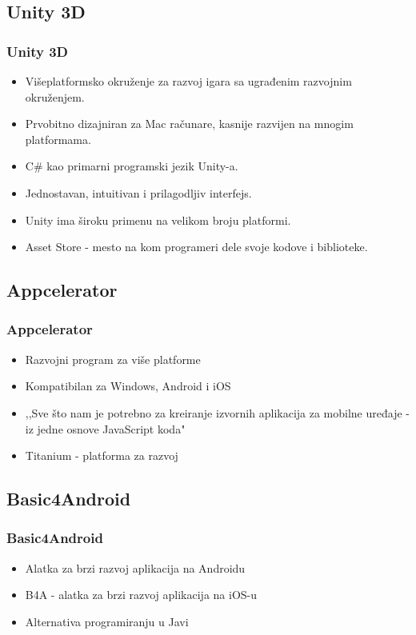 \documentclass{beamer}
\begin{document}
\begin{frame}
    \section{Unity 3D}
    \frametitle{Unity 3D} 
    \begin{itemize}
	\item Višeplatformsko okruženje za razvoj igara sa ugrađenim razvojnim okruženjem. 
        \item Prvobitno dizajniran za Mac računare, kasnije razvijen na mnogim platformama. 
	\item C# kao primarni programski jezik Unity-a.
	\item Jednostavan, intuitivan i prilagodljiv interfejs.
        \item Unity ima široku primenu na velikom broju platformi.
	\item Asset Store - mesto na kom programeri dele svoje kodove i biblioteke. 
   \end{itemize}
\end{frame}

\begin{frame}
    \section{Appcelerator}
    \frametitle{Appcelerator} 
    \begin{itemize}
    	\item Razvojni program za više platforme
	\item Kompatibilan za Windows, Android i iOS
	\item ,,Sve što nam je potrebno za kreiranje izvornih aplikacija za mobilne uređaje - iz jedne osnove JavaScript koda"
	\item  Titanium - platforma za razvoj
   \end{itemize}
\end{frame}

\begin{frame}
    \section{Basic4Android}
    \frametitle{Basic4Android} 
    \begin{itemize}
	\item Alatka za brzi razvoj aplikacija na Androidu
	\item B4A - alatka za brzi razvoj aplikacija na iOS-u
	\item Alternativa programiranju u Javi
   \end{itemize}
\end{frame}
\end{document}
